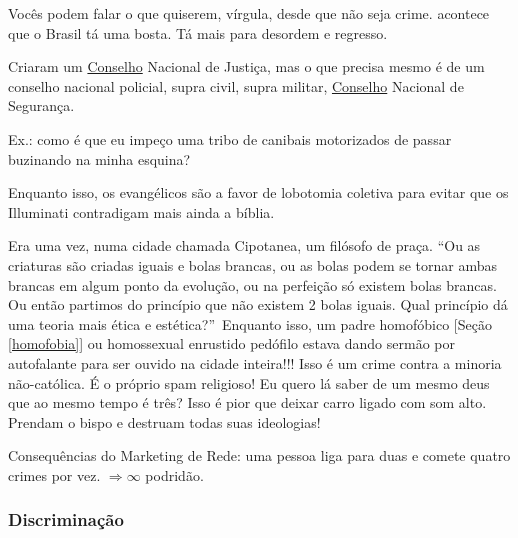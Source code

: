 \documentclass[12pt,a4paper]{article}
\begin{document}
			\begin{flushright}
			\end{flushright}

			Voc\^es podem falar o que quiserem, v\'irgula, desde que n\~ao seja crime. acontece que o Brasil t\'a uma bosta. T\'a mais para desordem e regresso.

			Criaram um \href{http://www.cnj.jus.br}{Conselho} Nacional de Justi\c{c}a, mas o que precisa mesmo \'e de um conselho nacional policial, supra civil, supra militar, \href{http://www.conseg.gov.br}{Conselho} Nacional de Seguran\c{c}a.

			Ex.: como \'e que eu impe\c{c}o uma tribo de canibais motorizados de passar buzinando na minha esquina?

Enquanto isso, os evang\'elicos s\~ao a favor de lobotomia coletiva para
evitar que os Illuminati\cite{x} contradigam mais ainda a b\'iblia.

				\begin{flushright}
				\end{flushright}

				Era uma vez, numa cidade chamada Cipotanea, um fil\'osofo de pra\c{c}a. \textquotedblleft Ou as criaturas s\~ao criadas iguais e bolas brancas, ou as
bolas podem se tornar ambas brancas em algum ponto da evolu\c{c}\~ao, ou na
perfei\c{c}\~ao s\'o existem bolas brancas. Ou ent\~ao partimos do princ\'ipio que
n\~ao existem 2 bolas iguais. Qual princ\'ipio d\'a uma teoria mais \'etica e
est\'etica?\textquotedblright\, Enquanto isso, um padre homof\'obico [Se\c{c}\~ao \ref{homofobia}] ou homossexual enrustido
ped\'ofilo estava dando serm\~ao por autofalante para ser ouvido na cidade
inteira!!! Isso \'e um crime contra a minoria n\~ao-cat\'olica. \'E o pr\'oprio
spam religioso! Eu quero l\'a saber de um mesmo deus que ao mesmo tempo \'e
tr\^es? Isso \'e pior que deixar carro ligado com som alto. Prendam o bispo e
 destruam todas suas ideologias! %

				\begin{flushright}
				\end{flushright}

			Consequ\^encias do Marketing de Rede: uma pessoa liga para duas e comete quatro crimes por vez. $\Rightarrow \infty$ podrid\~ao.

			\subsubsection{Discrimina\c{c}\~ao}
\end{document}
